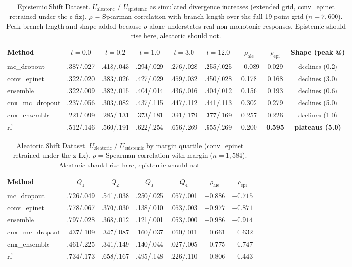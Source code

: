 \begin{table}[H]
\centering
\caption{Epistemic Shift Dataset. $U_{\text{aleatoric}}$ / $U_{\text{epistemic}}$
as simulated divergence increases (extended grid, conv\_epinet retrained
under the z-fix). $\rho$ = Spearman correlation with branch length over the
full 19-point grid ($n{=}7{,}600$). Peak branch length and shape added
because $\rho$ alone understates real non-monotonic responses. Epistemic
should rise here, aleatoric should not.}
\label{tab:alisim-decomp}
\begin{tabular}{lccccc ccc}
\toprule
Method & $t{=}0.0$ & $t{=}0.2$ & $t{=}1.0$ & $t{=}3.0$ & $t{=}12.0$ & $\rho_{\text{ale}}$ & $\rho_{\text{epi}}$ & Shape (peak @) \\
\midrule
mc\_dropout      & .387/.027 & .418/.043 & .294/.029 & .276/.028 & .255/.025 & $-0.089$ & 0.029 & declines (0.2) \\
conv\_epinet     & .322/.020 & .383/.026 & .427/.029 & .469/.032 & .450/.028 & 0.178 & 0.168 & declines (3.0) \\
ensemble         & .322/.009 & .382/.015 & .404/.014 & .436/.016 & .404/.012 & 0.156 & 0.193 & declines (0.6) \\
cnn\_mc\_dropout & .237/.056 & .303/.082 & .437/.115 & .447/.112 & .441/.113 & 0.302 & 0.279 & declines (5.0) \\
cnn\_ensemble    & .221/.099 & .285/.131 & .373/.181 & .391/.179 & .377/.169 & 0.257 & 0.226 & declines (1.0) \\
rf               & .512/.146 & .560/.191 & .622/.254 & .656/.269 & .655/.269 & 0.200 & \textbf{0.595} & \textbf{plateaus (5.0)} \\
\bottomrule
\end{tabular}
\end{table}

\begin{table}[H]
\centering
\caption{Aleatoric Shift Dataset. $U_{\text{aleatoric}}$ / $U_{\text{epistemic}}$
by margin quartile (conv\_epinet retrained under the z-fix).
$\rho$ = Spearman correlation with margin ($n{=}1{,}584$). Aleatoric should
rise here, epistemic should not.}
\label{tab:boundary-decomp}
\begin{tabular}{lcccc cc}
\toprule
Method & $Q_1$ & $Q_2$ & $Q_3$ & $Q_4$ & $\rho_{\text{ale}}$ & $\rho_{\text{epi}}$ \\
\midrule
mc\_dropout       & .726/.049 & .541/.038 & .250/.025 & .067/.001 & $-0.886$ & $-0.715$ \\
conv\_epinet      & .778/.067 & .370/.030 & .138/.010 & .063/.003 & $-0.977$ & $-0.871$ \\
ensemble          & .797/.028 & .368/.012 & .121/.001 & .053/.000 & $\mathbf{-0.986}$ & $-0.914$ \\
cnn\_mc\_dropout  & .437/.109 & .347/.087 & .160/.037 & .060/.011 & $-0.661$ & $-0.632$ \\
cnn\_ensemble     & .461/.225 & .341/.149 & .140/.044 & .027/.005 & $-0.775$ & $-0.747$ \\
rf                & .734/.173 & .658/.167 & .495/.148 & .226/.110 & $-0.806$ & $\mathbf{-0.443}$ \\
\bottomrule
\end{tabular}
\end{table}

